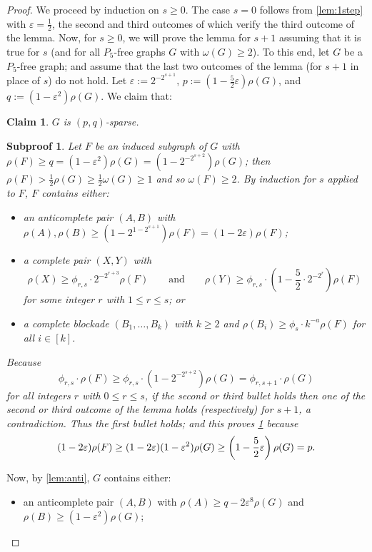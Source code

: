 \documentclass[10pt,a4paper]{amsart}
\newtheorem{claim}{Claim}
\newtheorem{subproof}{Subproof}
\newcommand{\eps}{\varepsilon}
\begin{document}
	\begin{proof}
		We proceed by induction on $s\ge0$. The case $s=0$ follows from \cref{lem:1step} with $\eps=\frac12$, the second and third outcomes of which verify the third outcome of the lemma.
		Now, for $s\ge0$, we will prove the lemma for $s+1$ assuming that it is true for $s$ (and for all $P_5$-free graphs $G$ with $\omega(G)\ge2$).
		To this end, let $G$ be a $P_5$-free graph; and assume that the last two outcomes of the lemma (for $s+1$ in place of $s$) do not hold. Let $\eps:=2^{-2^{s+1}}$, $p:=(1-\frac52\eps)\rho(G)$, and $q:=(1-\eps^{2})\rho(G)$.
		We claim that:
		\begin{claim}
			\label{claim:incrho}
			$G$ is $(p,q)$-sparse.
		\end{claim}
		\begin{subproof}
			Let $F$ be an induced subgraph of $G$ with $\rho(F)\ge q=(1-\eps^2)\rho(G)=(1-2^{-2^{s+2}})\rho(G)$;
			then $\rho(F)>\frac12\rho(G)\ge\frac12\omega(G)\ge1$ and so $\omega(F)\ge2$.
			By induction for $s$ applied to $F$, $F$ contains either:
			\begin{itemize}
				\item an anticomplete pair $(A,B)$ with $\rho(A),\rho(B)\ge(1-2^{1-2^{s+1}})\rho(F)=(1-2\eps)\rho(F)$;
				
				\item a complete pair $(X,Y)$ with $$\rho(X)\ge\phi_{r,s}\cdot2^{-2^{r+3}}\rho(F)
				\qquad\text{and}\qquad
				\rho(Y)\ge\phi_{r,s}\cdot\left(1-\frac52\cdot2^{-2^{r}}\right)\rho(F)$$
				for some integer $r$ with $1\le r\le s$; or
				
				\item a complete blockade $(B_1,\ldots,B_k)$ with $k\ge2$ and $\rho(B_i)\ge\phi_s\cdot k^{-a}\rho(F)$ for all $i\in[k]$.
			\end{itemize}
			
			Because
			$$\phi_{r,s}\cdot\rho(F)\ge \phi_{r,s}\cdot(1-2^{-2^{s+2}})\rho(G)=\phi_{r,s+1}\cdot\rho(G)$$
			for all integers $r$ with $0\le r\le s$,
			if the second or third bullet holds then one of the second or third outcome of the lemma holds (respectively) for $s+1$, a contradiction.
			Thus the first bullet holds; and this proves \cref{claim:incrho}
			because
			\[(1-2\eps)\rho(F)\ge(1-2\eps)(1-\eps^2)\rho(G)\ge\left(1-\frac52\eps\right)\rho(G)=p.
			\qedhere\]
		\end{subproof}
		
		Now, by \cref{lem:anti}, $G$ contains either:
		\begin{itemize}
			\item an anticomplete pair $(A,B)$ with $\rho(A)\ge q-2\eps^8\rho(G)$ and $\rho(B)\ge(1-\eps^2)\rho(G)$;
			

\end{itemize}
\end{proof}
\end{document}
